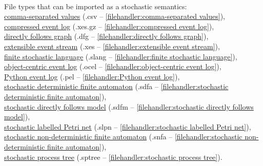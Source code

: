 {\\File types that can be imported as a stochastic semantics: \\\null\qquad\hyperref[filehandler:comma-separated values]{comma-separated values} (.csv -- \cref{filehandler:comma-separated values}), \\\null\qquad\hyperref[filehandler:compressed event log]{compressed event log} (.xes.gz -- \cref{filehandler:compressed event log}), \\\null\qquad\hyperref[filehandler:directly follows graph]{directly follows graph} (.dfg -- \cref{filehandler:directly follows graph}), \\\null\qquad\hyperref[filehandler:extensible event stream]{extensible event stream} (.xes -- \cref{filehandler:extensible event stream}), \\\null\qquad\hyperref[filehandler:finite stochastic language]{finite stochastic language} (.slang -- \cref{filehandler:finite stochastic language}), \\\null\qquad\hyperref[filehandler:object-centric event log]{object-centric event log} (.ocel -- \cref{filehandler:object-centric event log}), \\\null\qquad\hyperref[filehandler:Python event log]{Python event log} (.pel -- \cref{filehandler:Python event log}), \\\null\qquad\hyperref[filehandler:stochastic deterministic finite automaton]{stochastic deterministic finite automaton} (.sdfa -- \cref{filehandler:stochastic deterministic finite automaton}), \\\null\qquad\hyperref[filehandler:stochastic directly follows model]{stochastic directly follows model} (.sdfm -- \cref{filehandler:stochastic directly follows model}), \\\null\qquad\hyperref[filehandler:stochastic labelled Petri net]{stochastic labelled Petri net} (.slpn -- \cref{filehandler:stochastic labelled Petri net}), \\\null\qquad\hyperref[filehandler:stochastic non-deterministic finite automaton]{stochastic non-deterministic finite automaton} (.snfa -- \cref{filehandler:stochastic non-deterministic finite automaton}), \\\null\qquad\hyperref[filehandler:stochastic process tree]{stochastic process tree} (.sptree -- \cref{filehandler:stochastic process tree}).
}
